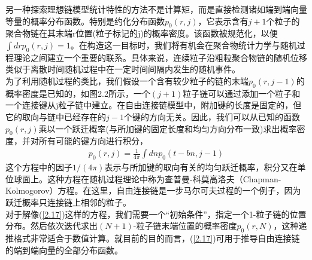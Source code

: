 另一种探索理想链模型统计特性的方法不是计算矩，而是直接检测诸如端到端向量等量的概率分布函数。特别是约化分布函数$p_{0}(r,j)$，它表示含有$j+1$个粒子的聚合物链在其末端r位置(粒子标记的j)的概率密度。该函数被规范化，以便$\int drp_0(r,j)=1$。在构造这一目标时，我们将有机会在聚合物统计力学与随机过程理论之间建立一个重要的联系。具体来说，连续粒子沿粗粒聚合物链的随机位移类似于离散时间随机过程中在一定时间间隔内发生的随机事件。\\

为了利用随机过程的类比，我们假设一个含有较少粒子的链的末端$p_{0}(r,j-1)$的概率密度是已知的，如图2.2所示，一个$(j+1)$粒子链可以通过添加一个粒子和一个连接键从j粒子链中建立。在自由连接链模型中，附加键的长度是固定的，但它的取向与链中已经存在的$j−1$个键的方向无关。因此，我们可以从已知的函数$p_{0}(r,j)$乘以一个跃迁概率(与所加键的固定长度和均匀方向分布一致)求出概率密度，并对所有可能的键方向进行积分，\\
\begin{gather}
p_{0}(r,j)=\frac{1}{4 \pi} \int dnp_0(t-bn,j-1)
\label{2.17}
\end{gather}
这个方程中的因子$1/(4 \pi)$表示与所加键的取向有关的均匀跃迁概率，积分又在单位球面上。这种方程在随机过程理论中称为查普曼-科莫高洛夫（Chapman-Kolmogorov）方程。在这里，自由连接链是一步马尔可夫过程的一个例子，因为跃迁概率只连接链上相邻的粒子。\\

对于解像(\ref{2.17})这样的方程，我们需要一个“初始条件”，指定一个1-粒子链的位置分布。然后依次迭代求出$(N+1)$-粒子链末端位置的概率密度$p_{0}(r,N)$，这种递推格式非常适合于数值计算。就目前的目的而言，(\ref{2.17})可用于推导自由连接链的端到端向量的全部分布函数。\\

